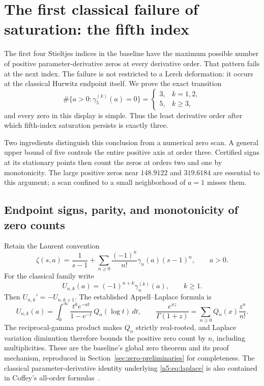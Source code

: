 
\section{The first classical failure of saturation: the fifth index}
\label{n5:sec:transition}\label{sec:classical-zeros}

The first four Stieltjes indices in the baseline have the maximum possible
number of positive parameter-derivative zeros at every derivative order.
That pattern fails at the next index.  The failure is not restricted to a
Lerch deformation: it occurs at the classical Hurwitz endpoint itself.
We prove the exact transition
\begin{equation}\label{n5:eq:count-sequence}
 \#\{a>0:\gamma_5^{(k)}(a)=0\}=
 \begin{cases}3,&k=1,2,\\5,&k\geq3,\end{cases}
\end{equation}
and every zero in this display is simple.  Thus the least derivative order
after which fifth-index saturation persists is exactly three.

Two ingredients distinguish this conclusion from a numerical zero scan.
A general upper bound of five controls the entire positive axis at order
three.  Certified signs at its stationary points then count the zeros at
orders two and one by monotonicity.  The large positive zeros near
$148.9122$ and $319.6184$ are essential to this argument; a scan confined to
a small neighborhood of $a=1$ misses them.

\subsection{Endpoint signs, parity, and monotonicity of zero counts}

Retain the Laurent convention
\[
 \zeta(s,a)=\frac1{s-1}+
       \sum_{n\geq0}\frac{(-1)^n}{n!}\gamma_n(a)(s-1)^n,
 \qquad a>0.
\]
For the classical family write
\[
 U_{n,k}(a)=(-1)^{n+k}\gamma_n^{(k)}(a),\qquad k\geq1.
\]
Then $U_{n,k}'=-U_{n,k+1}$.  The established Appell--Laplace formula is
\begin{equation}\label{n5:eq:laplace}
 U_{n,k}(a)=\int_0^\infty
 \frac{t^k e^{-at}}{1-e^{-t}}\,Q_n(\log t)\,dt,
 \qquad
 \frac{e^{xz}}{\Gamma(1+z)}=
       \sum_{n\geq0}Q_n(x)\frac{z^n}{n!}.
\end{equation}
The reciprocal-gamma product makes $Q_n$ strictly real-rooted, and Laplace
variation diminution therefore bounds the positive zero count by $n$,
including multiplicities.  These are the baseline's global zero theorem
and its proof mechanism, reproduced in Section~\ref{sec:zero-preliminaries}
for completeness.  The classical parameter-derivative identity underlying
\eqref{n5:eq:laplace} is also contained in Coffey's all-order
formulas~\cite{Coffey}.

